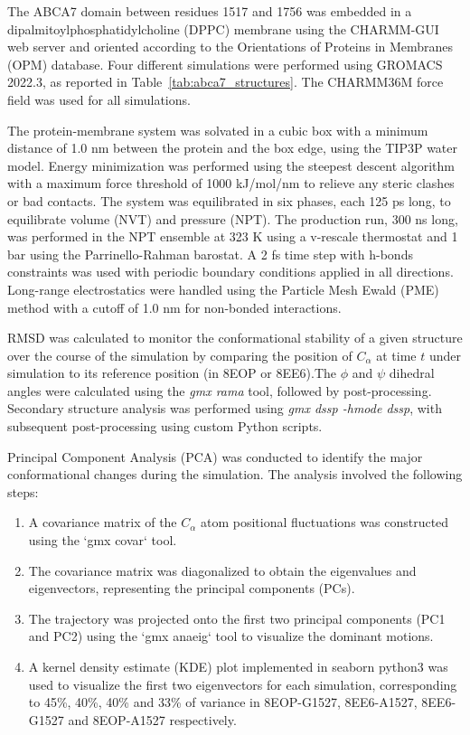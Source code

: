 \documentclass[12pt]{article}
\begin{document}
The ABCA7 domain between residues 1517 and 1756 was embedded in a dipalmitoylphosphatidylcholine (DPPC) membrane using the CHARMM-GUI web server and oriented according to the Orientations of Proteins in Membranes (OPM) database. Four different simulations were performed using GROMACS 2022.3, as reported in Table~\ref{tab:abca7_structures}. The CHARMM36M force field was used for all simulations.  
 
The protein-membrane system was solvated in a cubic box with a minimum distance of 1.0 nm between the protein and the box edge, using the TIP3P water model. Energy minimization was performed using the steepest descent algorithm with a maximum force threshold of 1000 kJ/mol/nm to relieve any steric clashes or bad contacts. The system was equilibrated in six phases, each 125 ps long, to equilibrate volume (NVT) and pressure (NPT). The production run, 300 ns long, was performed in the NPT ensemble at 323 K using a v-rescale thermostat and 1 bar using the Parrinello-Rahman barostat. A 2 fs time step with h-bonds constraints was used with periodic boundary conditions applied in all directions. Long-range electrostatics were handled using the Particle Mesh Ewald (PME) method with a cutoff of 1.0 nm for non-bonded interactions. 
 
RMSD was calculated to monitor the conformational stability of a given structure over the course of the simulation by comparing the position of $C_\alpha$ at time $t$ under simulation to its reference position (in 8EOP or 8EE6).The $\phi$ and $\psi$ dihedral angles were calculated using the \textit{gmx rama} tool, followed by post-processing. Secondary structure analysis was performed using \textit{gmx dssp -hmode dssp}, with subsequent post-processing using custom Python scripts.
 
Principal Component Analysis (PCA) was conducted to identify the major conformational changes during the simulation. The analysis involved the following steps:
\begin{enumerate}
    \item A covariance matrix of the $C_\alpha$ atom positional fluctuations was constructed using the `gmx covar` tool. 
    \item The covariance matrix was diagonalized to obtain the eigenvalues and eigenvectors, representing the principal components (PCs). 
    \item The trajectory was projected onto the first two principal components (PC1 and PC2) using the `gmx anaeig` tool to visualize the dominant motions.  
    \item A kernel density estimate (KDE) plot implemented in seaborn python3 was used to visualize the first two eigenvectors for each simulation, corresponding to 45\%, 40\%, 40\% and 33\% of variance in 8EOP-G1527, 8EE6-A1527, 8EE6-G1527 and 8EOP-A1527 respectively. 
\end{enumerate}
\end{document}
